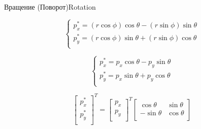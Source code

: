 \documentclass{beamer}
\begin{document}
\begin{frame}{Вращение (Поворот)}{Rotation}
{			\[
				\begin{cases}
					p_x^* = (r \cos \phi) \cos \theta - (r \sin \phi) \sin \theta \\
					p_y^* = (r \cos \phi) \sin \theta + (r \sin \phi) \cos \theta \\
				\end{cases}
			\]

			\[
				\begin{cases}
					p_x^* = p_x \cos \theta - p_y \sin \theta \\
					p_y^* = p_x \sin \theta + p_y \cos \theta \\
				\end{cases}
			\]

			\[
				\begin{bmatrix}
					p_x^* \\
					p_y^* \\
				\end{bmatrix}^T
			 =
			 \begin{bmatrix}
				p_x \\
				p_y \\
			\end{bmatrix}^T
			\begin{bmatrix}
				\cos \theta & \sin \theta \\
				-\sin \theta & \cos \theta  \\
			\end{bmatrix}
		\]
	
		}
	\end{frame}
\end{document}
